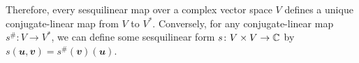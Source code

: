 \documentclass[math]{amznotes}
\makeatletter
\let\save@mathaccent\mathaccent
\newcommand*\if@single[3]{%
  \setbox0\hbox{${\mathaccent"0362{#1}}^H$}%
  \setbox2\hbox{${\mathaccent"0362{\kern0pt#1}}^H$}%
  \ifdim\ht0=\ht2 #3\else #2\fi
  }
\newcommand*\rel@kern[1]{\kern#1\dimexpr\macc@kerna}
\newcommand*\widebar[1]{\@ifnextchar^{{\wide@bar{#1}{0}}}{\wide@bar{#1}{1}}}
\newcommand*\wide@bar[2]{\if@single{#1}{\wide@bar@{#1}{#2}{1}}{\wide@bar@{#1}{#2}{2}}}
\newcommand*\wide@bar@[3]{%
  \begingroup
  \def\mathaccent##1##2{%
    \let\mathaccent\save@mathaccent
    \if#32 \let\macc@nucleus\first@char \fi
    \setbox\z@\hbox{$\macc@style{\macc@nucleus}_{}$}%
    \setbox\tw@\hbox{$\macc@style{\macc@nucleus}{}_{}$}%
    \dimen@\wd\tw@
    \advance\dimen@-\wd\z@
    \divide\dimen@ 3
    \@tempdima\wd\tw@
    \advance\@tempdima-\scriptspace
    \divide\@tempdima 10
    \advance\dimen@-\@tempdima
    \ifdim\dimen@>\z@ \dimen@0pt\fi
    \rel@kern{0.6}\kern-\dimen@
    \if#31
      \overline{\rel@kern{-0.6}\kern\dimen@\macc@nucleus\rel@kern{0.4}\kern\dimen@}%
      \advance\dimen@0.4\dimexpr\macc@kerna
      \let\final@kern#2%
      \ifdim\dimen@<\z@ \let\final@kern1\fi
      \if\final@kern1 \kern-\dimen@\fi
    \else
      \overline{\rel@kern{-0.6}\kern\dimen@#1}%
    \fi
  }%
  \macc@depth\@ne
  \let\math@bgroup\@empty \let\math@egroup\macc@set@skewchar
  \mathsurround\z@ \frozen@everymath{\mathgroup\macc@group\relax}%
  \macc@set@skewchar\relax
  \let\mathaccentV\macc@nested@a
  \if#31
    \macc@nested@a\relax111{#1}%
  \else
    \def\gobble@till@marker##1\endmarker{}%
    \futurelet\first@char\gobble@till@marker#1\endmarker
    \ifcat\noexpand\first@char A\else
      \def\first@char{}%
    \fi
    \macc@nested@a\relax111{\first@char}%
  \fi
  \endgroup
}
\theoremstyle{remark}
\makeatother
\begin{document}
    Therefore, every sesquilinear map over a complex vector space $V$ defines a unique conjugate-linear map from $V$ to $V^*$. Conversely, for any conjugate-linear map $s^{\#} \colon V \to V^*$, we can define some sesquilinear form $s \colon V \times V \to \mathbb{C}$ by $s(\mathbfit{u}, \mathbfit{v}) = s^{\#}(\mathbfit{v})(\mathbfit{u})$.
\end{document}

